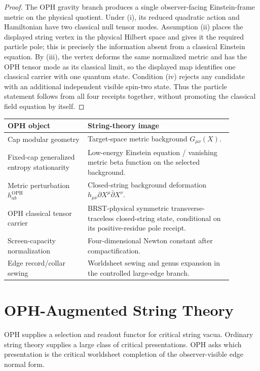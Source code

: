 \documentclass[11pt]{article}
\theoremstyle{remark}
\theoremstyle{plain}
\newcommand{\OPH}{\mathrm{OPH}}
\begin{document}
\begin{proof}
The OPH gravity branch produces a single observer-facing Einstein-frame metric on the physical
quotient. Under (i), its reduced quadratic action and Hamiltonian have two classical null tensor
modes. Assumption (ii) places the displayed string vertex in the physical Hilbert space and gives
it the required particle pole; this is precisely the information absent from a classical Einstein
equation. By (iii), the vertex deforms the same normalized metric and has the OPH tensor mode as its
classical limit, so the displayed map identifies one classical carrier with one quantum state.
Condition (iv) rejects any candidate with an additional independent visible spin-two state. Thus
the particle statement follows from all four receipts together, without promoting the classical
field equation by itself.
\end{proof}

\begin{center}
\small
\begin{tabular}{p{0.31\linewidth}p{0.57\linewidth}}
\toprule
\textbf{OPH object} & \textbf{String-theory image} \\
\midrule
Cap modular geometry & Target-space metric background \(G_{\mu\nu}(X)\). \\
Fixed-cap generalized entropy stationarity & Low-energy Einstein equation / vanishing metric beta function on the selected background. \\
Metric perturbation \(h^{\OPH}_{ab}\) & Closed-string background deformation \(h_{\mu\nu}\partial X^\mu\bar\partial X^\nu\). \\
OPH classical tensor carrier & BRST-physical symmetric transverse-traceless closed-string state,
conditional on its positive-residue pole receipt. \\
Screen-capacity normalization & Four-dimensional Newton constant after compactification. \\
Edge record/collar sewing & Worldsheet sewing and genus expansion in the controlled large-edge branch. \\
\bottomrule
\end{tabular}
\end{center}

\section{OPH-Augmented String Theory}\label{sec:oph-augmented-string}

OPH supplies a selection and readout functor for critical string vacua. Ordinary string theory
supplies a large class of critical presentations. OPH asks which presentation is the critical
worldsheet completion of the observer-visible edge normal form.
\end{document}
